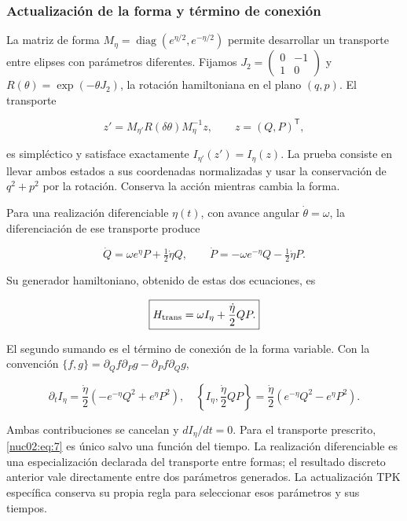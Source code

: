 \subsubsection{Actualización de la forma y término de conexión}

La matriz de forma \(M_\eta=\operatorname{diag}(e^{\eta/2},e^{-\eta/2})\) permite desarrollar un transporte entre elipses con parámetros diferentes. Fijamos \(J_2=\begin{pmatrix}0&-1\\1&0\end{pmatrix}\) y \(R(\theta)=\exp(-\theta J_2)\), la rotación hamiltoniana en el plano \((q,p)\). El transporte

\[
z'=M_{\eta'}R(\delta\theta)M_\eta^{-1}z,
\qquad z=(Q,P)^\mathsf T,
\]

es simpléctico y satisface exactamente \(I_{\eta'}(z')=I_\eta(z)\). La prueba consiste en llevar ambos estados a sus coordenadas normalizadas y usar la conservación de \(q^2+p^2\) por la rotación. Conserva la acción mientras cambia la forma.

Para una realización diferenciable \(\eta(t)\), con avance angular \(\dot\theta=\omega\), la diferenciación de ese transporte produce

\[
\dot Q=\omega e^\eta P+\tfrac12\dot\eta Q,\qquad
\dot P=-\omega e^{-\eta}Q-\tfrac12\dot\eta P.
\]

Su generador hamiltoniano, obtenido de estas dos ecuaciones, es

\begin{equation}
\boxed{H_{\rm trans}=\omega I_\eta+\frac{\dot\eta}{2}QP.}\label{nuc02:eq:7}
\end{equation}

El segundo sumando es el término de conexión de la forma variable. Con la convención \(\{f,g\}=\partial_Qf\partial_Pg-\partial_Pf\partial_Qg\),

\[
\partial_tI_\eta=\frac{\dot\eta}{2}(-e^{-\eta}Q^2+e^\eta P^2),
\quad
\left\{I_\eta,\frac{\dot\eta}{2}QP\right\}
=\frac{\dot\eta}{2}(e^{-\eta}Q^2-e^\eta P^2).
\]

Ambas contribuciones se cancelan y \(dI_\eta/dt=0\). Para el transporte prescrito, \eqref{nuc02:eq:7} es único salvo una función del tiempo. La realización diferenciable es una especialización declarada del transporte entre formas; el resultado discreto anterior vale directamente entre dos parámetros generados. La actualización TPK específica conserva su propia regla para seleccionar esos parámetros y sus tiempos.

